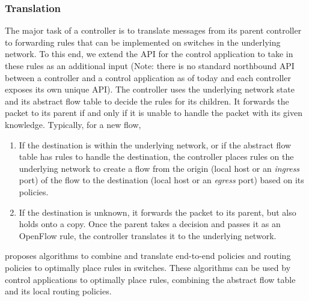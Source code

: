 \documentclass[10pt, twocolumn]{article}
\begin{document}
\subsubsection{Translation}
The major task of a controller is to translate messages from its parent controller to forwarding rules that can be implemented on switches in the underlying network. To this end, we extend the API for the control application to take in these rules as an additional input (Note: there is no standard northbound API between a controller and a control application as of today and each controller exposes its own unique API). The controller uses the underlying network state and its abstract flow table to decide the rules for its children. It forwards the packet to its parent if and only if it is unable to handle the packet with its given knowledge. Typically, for a new flow,
\begin{enumerate}
    \item If the destination is within the underlying network, or if the abstract flow table has rules to handle the destination, the controller places rules on the underlying network to create a flow from the origin (local host or an \emph{ingress} port) of the flow to the destination (local host or an \emph{egress} port) based on its policies.
    \item If the destination is unknown, it forwards the packet to its parent, but also holds onto a copy. Once the parent takes a decision and passes it as an OpenFlow rule, the controller translates it to the underlying network.
\end{enumerate}

\cite{one-big-switch} proposes algorithms to combine and translate end-to-end policies and routing policies to optimally place rules in switches. These algorithms can be used by control applications to optimally place rules, combining the abstract flow table and its local routing policies.
\end{document}
